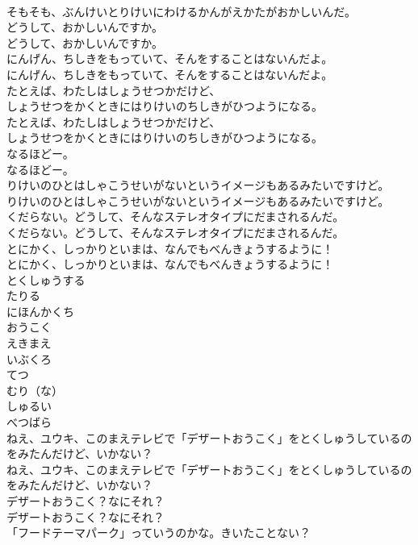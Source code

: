 \documentclass[8pt]{extreport}
\begin{document}
\begin{CJK}{UTF8}{min}
\\	そもそも、ぶんけいとりけいにわけるかんがえかたがおかしいんだ。
\\	どうして、おかしいんですか。
\\	どうして、おかしいんですか。
\\	にんげん、ちしきをもっていて、そんをすることはないんだよ。
\\	にんげん、ちしきをもっていて、そんをすることはないんだよ。
\\	たとえば、わたしはしょうせつかだけど、
\\	しょうせつをかくときにはりけいのちしきがひつようになる。
\\	たとえば、わたしはしょうせつかだけど、
\\	しょうせつをかくときにはりけいのちしきがひつようになる。
\\	なるほどー。
\\	なるほどー。
\\	りけいのひとはしゃこうせいがないというイメージもあるみたいですけど。
\\	りけいのひとはしゃこうせいがないというイメージもあるみたいですけど。
\\	くだらない。どうして、そんなステレオタイプにだまされるんだ。
\\	くだらない。どうして、そんなステレオタイプにだまされるんだ。
\\	とにかく、しっかりといまは、なんでもべんきょうするように！
\\	とにかく、しっかりといまは、なんでもべんきょうするように！
\\	とくしゅうする
\\	たりる
\\	にほんかくち
\\	おうこく
\\	えきまえ
\\	いぶくろ
\\	てつ
\\	むり（な）
\\	しゅるい
\\	べつばら
\\	ねえ、ユウキ、このまえテレビで「デザートおうこく」をとくしゅうしているのをみたんだけど、いかない？
\\	ねえ、ユウキ、このまえテレビで「デザートおうこく」をとくしゅうしているのをみたんだけど、いかない？
\\	デザートおうこく？なにそれ？
\\	デザートおうこく？なにそれ？
\\	「フードテーマパーク」っていうのかな。きいたことない？

\end{CJK}
\end{document}
